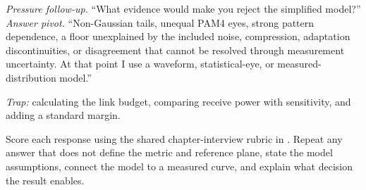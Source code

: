 \textit{Pressure follow-up.} ``What evidence would make you reject the
simplified model?''\\
\textit{Answer pivot.} ``Non-Gaussian tails, unequal PAM4 eyes, strong pattern
dependence, a floor unexplained by the included noise, compression, adaptation
discontinuities, or disagreement that cannot be resolved through measurement
uncertainty. At that point I use a waveform, statistical-eye, or
measured-distribution model.''

\textit{Trap:} calculating the link budget, comparing receive power with
sensitivity, and adding a standard margin.

Score each response using the shared chapter-interview rubric in
. Repeat any answer that does not define the
metric and reference plane, state the model assumptions, connect the model to a
measured curve, and explain what decision the result enables.

